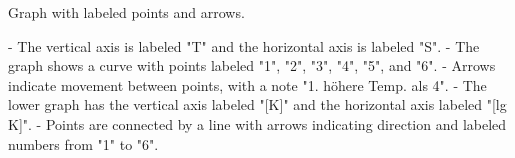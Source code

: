 Graph with labeled points and arrows. 

- The vertical axis is labeled "T" and the horizontal axis is labeled "S".
- The graph shows a curve with points labeled "1", "2", "3", "4", "5", and "6".
- Arrows indicate movement between points, with a note "1. höhere Temp. als 4".
- The lower graph has the vertical axis labeled "[K]" and the horizontal axis labeled "[lg K]".
- Points are connected by a line with arrows indicating direction and labeled numbers from "1" to "6".